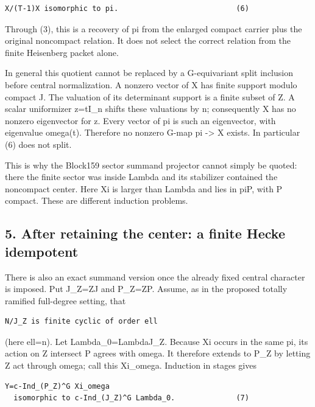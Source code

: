 \begin{Verbatim}[fontsize=\small,breaklines=true,breakanywhere=true]
X/(T-1)X isomorphic to pi.                           (6)
\end{Verbatim}

Through (3), this is a recovery of pi from the enlarged compact carrier
plus the original noncompact relation. It does not select the correct
relation from the finite Heisenberg packet alone.

In general this quotient cannot be replaced by a G-equivariant split
inclusion before central normalization. A nonzero vector of X has finite
support modulo compact J. The valuation of its determinant support is a
finite subset of Z. A scalar uniformizer z=tI\_n shifts these valuations
by n; consequently X has no nonzero eigenvector for z. Every vector of
pi is such an eigenvector, with eigenvalue omega(t). Therefore no
nonzero G-map pi -\textgreater{} X exists. In particular (6) does not
split.

This is why the Block159 sector summand projector cannot simply be
quoted: there the finite sector was inside Lambda and its stabilizer
contained the noncompact center. Here Xi is larger than Lambda and lies
in pi\textbar P, with P compact. These are different induction problems.

\hypertarget{lowrank_contract-after-retaining-the-center-a-finite-hecke-idempotent}{%
\subsection{5. After retaining the center: a finite Hecke
idempotent}\label{lowrank_contract-after-retaining-the-center-a-finite-hecke-idempotent}}

There is also an exact summand version once the already fixed central
character is imposed. Put J\_Z=ZJ and P\_Z=ZP. Assume, as in the
proposed totally ramified full-degree setting, that

\begin{Verbatim}[fontsize=\small,breaklines=true,breakanywhere=true]
N/J_Z is finite cyclic of order ell
\end{Verbatim}

(here ell=n). Let Lambda\_0=Lambda\textbar J\_Z. Because Xi occurs in
the same pi, its action on Z intersect P agrees with omega. It therefore
extends to P\_Z by letting Z act through omega; call this Xi\_omega.
Induction in stages gives

\begin{Verbatim}[fontsize=\small,breaklines=true,breakanywhere=true]
Y=c-Ind_(P_Z)^G Xi_omega
  isomorphic to c-Ind_(J_Z)^G Lambda_0.              (7)
\end{Verbatim}

